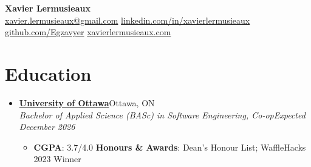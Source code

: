 \documentclass[letterpaper,11pt]{article}
\newcommand{\resumeItem}[1]{
  \item\small{
    {#1 \vspace{-2pt}}
  }
}
\newcommand{\resumeOrganization}[2]{
  \vspace{-2pt}\item
  \textbf{#1}\hfill #2\\[-1pt]
}
\newcommand{\resumeRole}[2]{
  \textit{\small #1}\hfill\textit{\small #2}\\[-4pt]
}
\newcommand{\resumeSubHeadingListStart}{\begin{itemize}[leftmargin=0.15in, label={}, itemsep=0pt]}
\newcommand{\resumeSubHeadingListEnd}{\end{itemize}}
\newcommand{\resumeItemListStart}{\begin{itemize}[leftmargin=0.22in, topsep=2pt, itemsep=0pt]}
\newcommand{\resumeItemListEnd}{\end{itemize}\vspace{-5pt}}
\begin{document}
\begin{center}
  \textbf{\Huge Xavier Lermusieaux} \\ \vspace{1pt}
  \href{mailto:xavier.lermusieaux@gmail.com}{xavier.lermusieaux@gmail.com} \textbar{}
  \href{https://linkedin.com/in/xavierlermusieaux}{linkedin.com/in/xavierlermusieaux} \textbar{}
  \href{https://github.com/Egzavyer}{github.com/Egzavyer} \textbar{}
  \href{https://xavierlermusieaux.com}{xavierlermusieaux.com}
\end{center}

\section{Education}
\resumeSubHeadingListStart
\resumeOrganization
{\href{https://www.uottawa.ca/en}{University of Ottawa}}{Ottawa, ON}
\resumeRole
{Bachelor of Applied Science (BASc) in Software Engineering, Co-op}{Expected December 2026}
\resumeItemListStart
\resumeItem{\textbf{CGPA}: 3.7/4.0 \textbar{} \textbf{Honours \& Awards}: Dean's Honour List; WaffleHacks 2023 Winner}
\resumeItemListEnd
\resumeSubHeadingListEnd
\end{document}
